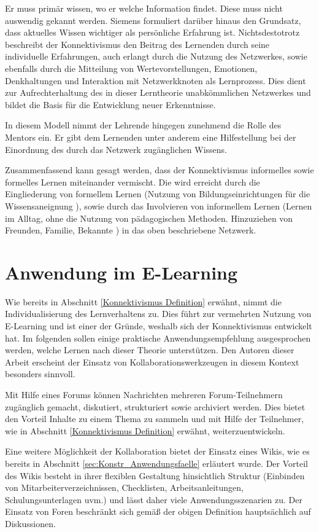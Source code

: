 Er muss primär wissen, wo er welche Information findet. Diese muss nicht auswendig gekannt werden. Siemens formuliert darüber hinaus den Grundsatz, dass aktuelles Wissen wichtiger als persönliche Erfahrung ist. Nichtsdestotrotz beschreibt der Konnektivismus den Beitrag des Lernenden durch seine individuelle Erfahrungen, auch erlangt durch die Nutzung des Netzwerkes, sowie ebenfalls durch die Mitteilung von Wertevorstellungen, Emotionen, Denkhaltungen und Interaktion mit Netzwerkknoten als Lernprozess. Dies dient zur Aufrechterhaltung des in dieser Lerntheorie unabkömmlichen Netzwerkes und bildet die Basis für die Entwicklung neuer Erkenntnisse.

In diesem Modell nimmt der Lehrende hingegen zunehmend die Rolle des Mentors ein. Er gibt dem Lernenden unter anderem eine Hilfestellung bei der Einordnung des durch das Netzwerk zugänglichen Wissens.

Zusammenfassend kann gesagt werden, dass der Konnektivismus informelles sowie formelles Lernen miteinander vermischt.\cite[S. 47ff.]{Kuhlmann.2008} Die wird erreicht durch die Eingliederung von formellem Lernen (Nutzung von Bildungseinrichtungen für die Wissensaneignung \cite[S. 75]{Hellmer.2007}), sowie durch das Involvieren von informellem Lernen (Lernen im Alltag, ohne die Nutzung von pädagogischen Methoden. Hinzuziehen von Freunden, Familie, Bekannte \cite[S. 76]{Hellmer.2007}) in das oben beschriebene Netzwerk.  

\section{Anwendung im E-Learning}
Wie bereits in Abschnitt \ref{Konnektivismus Definition} erwähnt, nimmt die Individualisierung des Lernverhaltens zu. Dies führt zur vermehrten Nutzung von E-Learning und ist einer der Gründe, weshalb sich der Konnektivismus entwickelt hat.\cite[S. 47f.]{Kuhlmann.2008} Im folgenden sollen einige praktische Anwendungsempfehlung ausgesprochen werden, welche Lernen nach dieser Theorie unterstützen. Den Autoren dieser Arbeit erscheint der Einsatz von Kollaborationswerkzeugen in diesem Kontext besonders sinnvoll. 

Mit Hilfe eines Forums können Nachrichten mehreren Forum-Teilnehmern zugänglich gemacht, diskutiert, strukturiert sowie archiviert werden. Dies bietet den Vorteil Inhalte zu einem Thema zu sammeln und mit Hilfe der Teilnehmer, wie in Abschnitt \ref{Konnektivismus Definition} erwähnt, weiterzuentwickeln.\cite[S. 67f.]{Drummer.2011}

Eine weitere Möglichkeit der Kollaboration bietet der Einsatz eines Wikis, wie es bereits in Abschnitt \ref{sec:Konstr_Anwendungsfaelle} erläutert wurde. Der Vorteil des Wikis besteht in ihrer flexiblen Gestaltung hinsichtlich Struktur (Einbinden von Mitarbeiterverzeichnissen, Checklisten, Arbeitsanleitungen, Schulungsunterlagen uvm.) und lässt daher viele Anwendungsszenarien zu.\cite[S. 77]{Mertins.2009} Der Einsatz von Foren beschränkt sich gemäß der obigen Definition hauptsächlich auf Diskussionen.